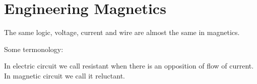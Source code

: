\documentclass[11pt]{article}
\begin{document}
\section{Engineering Magnetics}

The same logic, voltage, current and wire are almost the same in magnetics.\cite{em-as}

Some termonology:

In electric circuit we call resistant when there is an opposition of flow of
current. In magnetic circuit we call it reluctant.

\newpage
\printbibliography
\end{document}
